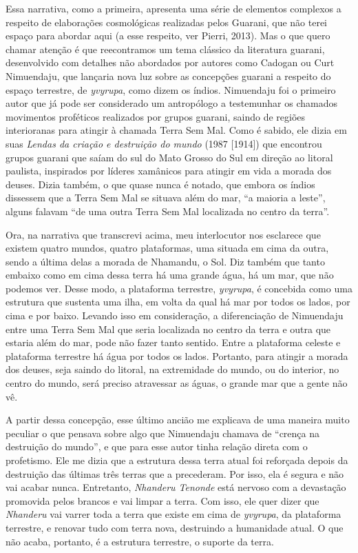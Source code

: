 Essa narrativa, como a primeira, apresenta uma série de elementos
complexos a respeito de elaborações cosmológicas realizadas pelos
Guarani, que não terei espaço para abordar aqui (a esse respeito, ver
Pierri, 2013). Mas o que quero chamar atenção é que reecontramos um
tema clássico da literatura guarani, desenvolvido com detalhes não
abordados por autores como Cadogan ou Curt Nimuendaju, que lançaria
nova luz sobre as concepções guarani a respeito do espaço terrestre, de
\emph{yvyrupa}, como dizem os índios. Nimuendaju foi o primeiro autor que já
pode ser considerado um antropólogo a testemunhar os chamados
movimentos proféticos realizados por grupos guarani, saindo de regiões
interioranas para atingir à chamada Terra Sem Mal. Como é sabido, ele
dizia em suas \emph{Lendas da criação e destruição do mundo} (1987 [1914]) que
encontrou grupos guarani que saíam do sul do Mato Grosso do Sul em
direção ao litoral paulista, inspirados por líderes xamânicos para
atingir em vida a morada dos deuses. Dizia também, o que quase nunca é
notado, que embora os índios dissessem que a Terra Sem Mal se situava
além do mar, ``a maioria a leste'', alguns falavam ``de uma outra Terra
Sem Mal localizada no centro da terra''.

Ora, na narrativa que transcrevi acima, meu interlocutor nos esclarece
que existem quatro mundos, quatro plataformas, uma situada em cima da
outra, sendo a última delas a morada de Nhamandu, o Sol. Diz também que
tanto embaixo como em cima dessa terra há uma grande água, há um mar,
que não podemos ver. Desse modo, a plataforma terrestre, \emph{yvyrupa}, é
concebida como uma estrutura que sustenta uma ilha, em volta da qual há
mar por todos os lados, por cima e por baixo. Levando isso em
consideração, a diferenciação de Nimuendaju entre uma Terra Sem Mal que
seria localizada no centro da terra e outra que estaria além do mar,
pode não fazer tanto sentido. Entre a plataforma celeste e plataforma
terrestre há água por todos os lados. Portanto, para atingir a morada
dos deuses, seja saindo do litoral, na extremidade do mundo, ou do
interior, no centro do mundo, será preciso atravessar as águas, o
grande mar que a gente não vê.

A partir dessa concepção, esse último ancião me explicava de uma maneira
muito peculiar o que pensava sobre algo que Nimuendaju chamava de
``crença na destruição do mundo'', e que para esse autor tinha relação
direta com o profetismo. Ele me dizia que a estrutura dessa terra atual
foi reforçada depois da destruição das últimas três terras que a
precederam. Por isso, ela é segura e não vai acabar nunca. Entretanto,
\emph{Nhanderu Tenonde} está nervoso com a devastação promovida pelos brancos
e vai limpar a terra. Com isso, ele quer dizer que \emph{Nhanderu} vai varrer
toda a terra que existe em cima de \emph{yvyrupa}, da plataforma terrestre, e
renovar tudo com terra nova, destruindo a humanidade atual. O que não
acaba, portanto, é a estrutura terrestre, o suporte da terra. 

